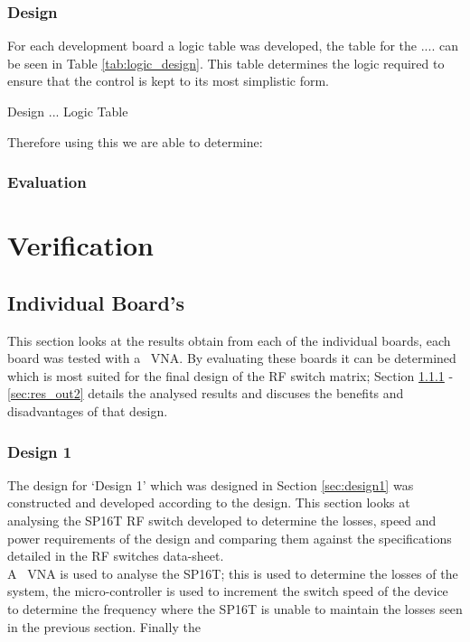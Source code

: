 \documentclass[12pt,openany,a4paper]{book}
\begin{document}
\subsection{Design}



For each development board a logic table was developed, the table for the .... can be seen in Table \ref{tab:logic_design}. This table determines the logic required to ensure that the control is kept to its most simplistic form.
\begin{table}
	\centering
	\caption{Design ... Logic Table}
	\label{tab:logic_design}
\end{table}
Therefore using this we are able to determine:

\subsection{Evaluation}











\chapter{Verification}

\section{Individual Board's}	\label{sec:indv_boards}
This section looks at the results obtain from each of the individual boards, each board was tested with a \model \ VNA. By evaluating these boards it can be determined which is most suited for the final design of the RF switch matrix; Section \ref{sec:res_des1} - \ref{sec:res_out2} details the analysed results and discuses the benefits and disadvantages of that design. 


\subsection{Design 1}	\label{sec:res_des1}
The design for `Design 1' which was designed in Section \ref{sec:design1} was constructed and developed according to the design. This section looks at analysing the SP16T RF switch developed to determine the losses, speed and power requirements of the design and comparing them against the specifications detailed in the RF switches data-sheet.\\
A \model \ VNA is used to analyse the SP16T; this is used to determine the losses of the system, the micro-controller is used to increment the switch speed of the device to determine the frequency where the SP16T is unable to maintain the losses seen in the previous section. Finally the 
 
\end{document}
